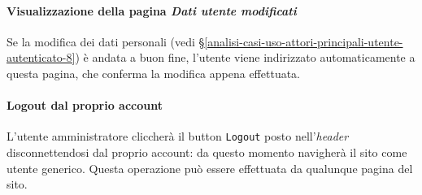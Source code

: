 \paragraph{Visualizzazione della pagina \textit{Dati utente modificati}}
\label{analisi-casi-uso-attori-principali-utente-autenticato-9}
Se la modifica dei dati personali (vedi §\ref{analisi-casi-uso-attori-principali-utente-autenticato-8}) è andata a buon fine, l'utente viene indirizzato automaticamente a questa pagina, che conferma la modifica appena effettuata.

\paragraph{Logout dal proprio account}
\label{analisi-casi-uso-attori-principali-utente-autenticato-10}
L'utente amministratore cliccherà il button \texttt{Logout} posto nell'\textit{header} disconnettendosi dal proprio account: da questo momento navigherà il sito come utente generico. Questa operazione può essere effettuata da qualunque pagina del sito.

